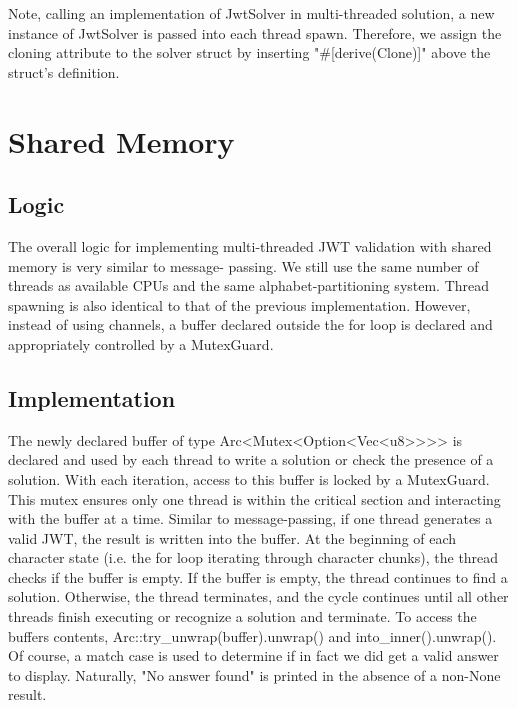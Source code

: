\documentclass[12pt]{article}
\begin{document}
\hspace{4mm} Note, calling an implementation of JwtSolver in multi-threaded solution, a new instance of JwtSolver is
passed into each thread spawn. Therefore, we assign the cloning attribute to the solver struct by inserting
"#[derive(Clone)]" above the struct's definition.

\section{Shared Memory}
\subsection{Logic}
\hspace{4mm} The overall logic for implementing multi-threaded JWT validation with shared memory is very similar to message-
passing. We still use the same number of threads as available CPUs and the same alphabet-partitioning system. Thread spawning
is also identical to that of the previous implementation. However, instead of using channels, a buffer declared outside the
for loop is declared and appropriately controlled by a MutexGuard.

\subsection{Implementation}
\hspace{4mm} The newly declared buffer of type Arc<Mutex<Option<Vec<u8>\hspace{0.25mm}>\hspace{0.25mm}>\hspace{0.25mm}>
is declared and used by each thread to write a solution or check the presence of a solution. With each iteration, access
to this buffer is locked by a MutexGuard. This mutex ensures only one thread is within the critical section and interacting
with the buffer at a time. Similar to message-passing, if one thread generates a valid JWT, the result is written into the
buffer. At the beginning of each character state (i.e. the for loop iterating through character chunks), the thread checks
if the buffer is empty. If the buffer is empty, the thread continues to find a solution. Otherwise, the thread terminates,
and the cycle continues until all other threads finish executing or recognize a solution and terminate. To access the buffers
contents, Arc::try\_unwrap(buffer).unwrap() and into\_inner().unwrap(). Of course, a match case is used to determine if in
fact we did get a valid answer to display. Naturally, "No answer found" is printed in the absence of a non-None result.
\end{document}
